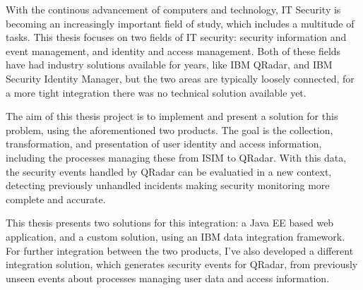 With the continous advancement of computers and technology, IT Security is becoming an increasingly important field of study, which includes a multitude of tasks. This thesis focuses on two fields of IT security: security information and event management, and identity and access management. Both of these fields have had industry solutions available for years, like IBM QRadar, and IBM Security Identity Manager, but the two areas are typically loosely connected, for a more tight integration there was no technical solution available yet.

The aim of this thesis project is to implement and present a solution for this problem, using the aforementioned two products. The goal is the collection, transformation, and presentation of user identity and access information, including the processes managing these from ISIM to QRadar. With this data, the security events handled by QRadar can be evaluatied in a new context, detecting previously unhandled incidents making security monitoring more complete and accurate.

This thesis presents two solutions for this integration: a Java EE based web application, and a custom solution, using an IBM data integration framework. For further integration between the two products, I've also developed a different integration solution, which generates security events for QRadar, from previously unseen events about processes managing user data and access information.


\vfill
\selectthesislanguage

\setcounter{romanPage}{\value{page}}
